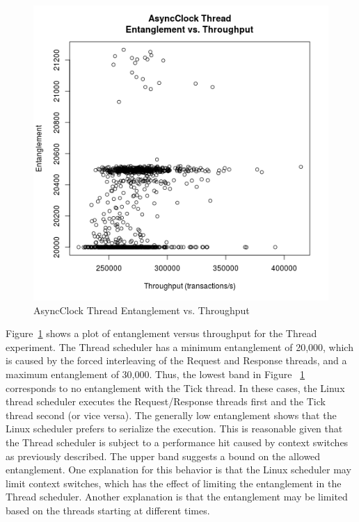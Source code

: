 \begin{figure}[H]
\center
\includegraphics[height=.4\textheight]{async_thread_throughput_entanglement.png}
\caption{AsyncClock Thread Entanglement vs. Throughput}
\label{async_thread_throughput_entanglement}
\end{figure}

Figure~\ref{async_thread_throughput_entanglement} shows a plot of entanglement versus throughput for the Thread experiment.
The Thread scheduler has a minimum entanglement of 20,000, which is caused by the forced interleaving of the Request and Response threads, and a maximum entanglement of 30,000.
Thus, the lowest band in Figure ~\ref{async_thread_throughput_entanglement} corresponds to no entanglement with the Tick thread.
In these cases, the Linux thread scheduler executes the Request/Response threads first and the Tick thread second (or vice versa).
The generally low entanglement shows that the Linux scheduler prefers to serialize the execution.
This is reasonable given that the Thread scheduler is subject to a performance hit caused by context switches as previously described.
The upper band suggests a bound on the allowed entanglement.
One explanation for this behavior is that the Linux scheduler may limit context switches, which has the effect of limiting the entanglement in the Thread scheduler.
Another explanation is that the entanglement may be limited based on the threads starting at different times.


